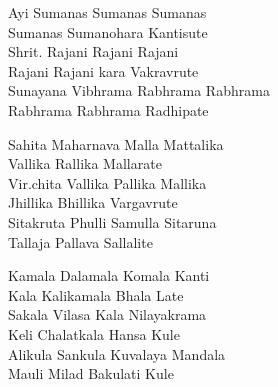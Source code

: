 Ayi Sumanas Sumanas Sumanas \\
Sumanas Sumanohara Kantisute \\
Shrit. Rajani Rajani Rajani \\
Rajani Rajani kara Vakravrute \\
Sunayana Vibhrama Rabhrama Rabhrama \\
Rabhrama Rabhrama Radhipate \linebreak[2]

Sahita Maharnava Malla Mattalika \\
Vallika Rallika Mallarate \\
Vir.chita Vallika Pallika Mallika \\
Jhillika Bhillika Vargavrute \\
Sitakruta Phulli Samulla Sitaruna \\
Tallaja Pallava Sallalite \linebreak[2]

Kamala Dalamala Komala Kanti \\
Kala Kalikamala Bhala Late \\
Sakala Vilasa Kala Nilayakrama \\
Keli Chalatkala Hansa Kule \\
Alikula Sankula Kuvalaya Mandala \\
Mauli Milad Bakulati Kule \linebreak[2]

\newpage